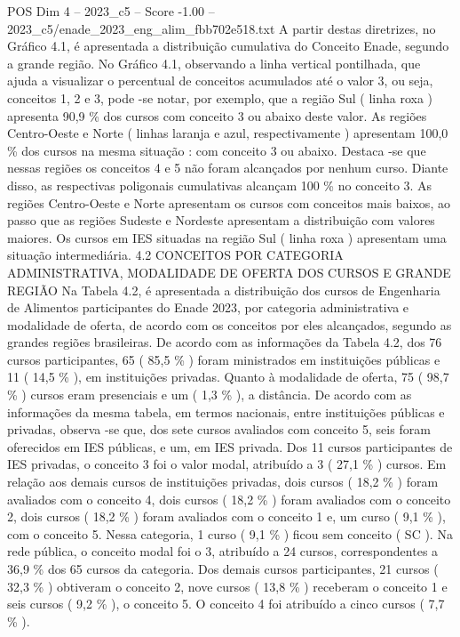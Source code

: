 \begin{textsample}{POS Dim 4 – 2023\_c5 – Score -1.00 – 2023\_c5/enade\_2023\_eng\_alim\_fbb702e518.txt}
A partir destas diretrizes, no Gráfico 4.1, é apresentada a distribuição cumulativa do Conceito Enade, segundo a grande região.
No Gráfico 4.1, observando a linha vertical pontilhada, que ajuda a visualizar o percentual de conceitos acumulados até o valor 3, ou seja, conceitos 1, 2 e 3, pode -se notar, por exemplo, que a região Sul ( linha roxa ) apresenta 90,9 \% dos cursos com conceito 3 ou abaixo deste valor.
As regiões Centro-Oeste e Norte ( linhas laranja e azul, respectivamente ) apresentam 100,0 \% dos cursos na mesma situação : com conceito 3 ou abaixo.
Destaca -se que nessas regiões os conceitos 4 e 5 não foram alcançados por nenhum curso.
Diante disso, as respectivas poligonais cumulativas alcançam 100 \% no conceito 3.
As regiões Centro-Oeste e Norte apresentam os cursos com conceitos mais baixos, ao passo que as regiões Sudeste e Nordeste apresentam a distribuição com valores maiores.
Os cursos em IES situadas na região Sul ( linha roxa ) apresentam uma situação intermediária. 4.2 CONCEITOS POR CATEGORIA ADMINISTRATIVA, MODALIDADE DE OFERTA DOS CURSOS E GRANDE REGIÃO Na Tabela 4.2, é apresentada a distribuição dos cursos de Engenharia de Alimentos participantes do Enade 2023, por categoria administrativa e modalidade de oferta, de acordo com os conceitos por eles alcançados, segundo as grandes regiões brasileiras.
De acordo com as informações da Tabela 4.2, dos 76 cursos participantes, 65 ( 85,5 \% ) foram ministrados em instituições públicas e 11 ( 14,5 \% ), em instituições privadas.
Quanto à modalidade de oferta, 75 ( 98,7 \% ) cursos eram presenciais e um ( 1,3 \% ), a distância.
De acordo com as informações da mesma tabela, em termos nacionais, entre instituições públicas e privadas, observa -se que, dos sete cursos avaliados com conceito 5, seis foram oferecidos em IES públicas, e um, em IES privada.
Dos 11 cursos participantes de IES privadas, o conceito 3 foi o valor modal, atribuído a 3 ( 27,1 \% ) cursos.
Em relação aos demais cursos de instituições privadas, dois cursos ( 18,2 \% ) foram avaliados com o conceito 4, dois cursos ( 18,2 \% ) foram avaliados com o conceito 2, dois cursos ( 18,2 \% ) foram avaliados com o conceito 1 e, um curso ( 9,1 \% ), com o conceito 5.
Nessa categoria, 1 curso ( 9,1 \% ) ficou sem conceito ( SC ).
Na rede pública, o conceito modal foi o 3, atribuído a 24 cursos, correspondentes a 36,9 \% dos 65 cursos da categoria.
Dos demais cursos participantes, 21 cursos ( 32,3 \% ) obtiveram o conceito 2, nove cursos ( 13,8 \% ) receberam o conceito 1 e seis cursos ( 9,2 \% ), o conceito 5.
O conceito 4 foi atribuído a cinco cursos ( 7,7 \% ).

\end{textsample}
